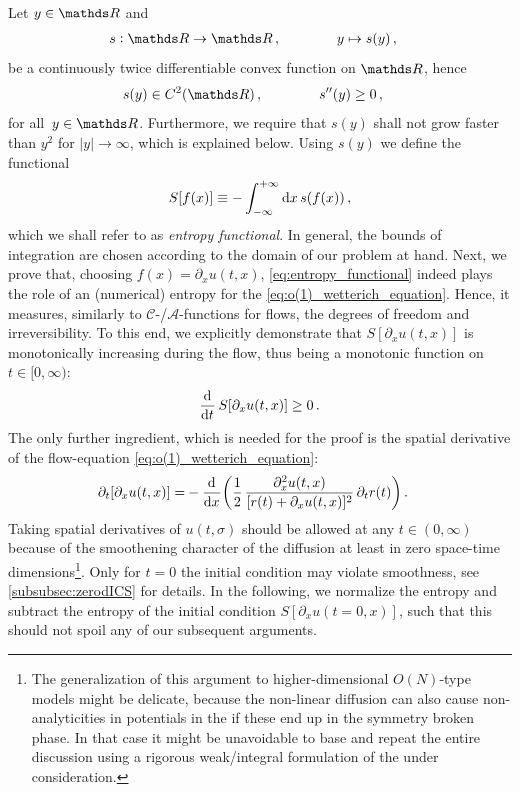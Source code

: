 Let $y \in \Reals{}$ and
\begin{align}
	&	s : \Reals{} \to \Reals{} \, ,	\qquad \qquad	y \mapsto s ( y ) \, ,
\end{align}
be a continuously twice differentiable convex function on $\Reals{}$, hence
\begin{align}
	&	s ( y ) \in C^2 ( \Reals{} ) \, ,\qquad \qquad	s^{\prime\prime} ( y ) \geq 0 \, ,	\label{eq:convexity_of_entropy_function}
\end{align}
for all~$y  \in \Reals{}$. 
Furthermore, we require that $s ( y )$ shall not grow faster than $y^2$ for $|y| \rightarrow \infty$, which is explained below. Using $s ( y )$ we define the functional
\begin{align}
	S [ f ( x ) ] \equiv - \int_{-\infty}^{+\infty} \dif x \, s ( f ( x ) ) \, ,	\label{eq:entropy_functional}
\end{align}
which we shall refer to as \textit{entropy functional}.
In general, the bounds of integration are chosen according to the domain of our problem at hand.
Next, we prove that, choosing $f ( x ) = \partial_x u ( t, x )$, \cref{eq:entropy_functional} indeed plays the role of an (numerical) entropy for the \pde{} \eqref{eq:o(1)_wetterich_equation}. 
Hence, it measures, similarly to $\mathcal{C}$-/$\mathcal{A}$-functions for \rg{} flows, the degrees of freedom and irreversibility.
To this end, we explicitly demonstrate that $S [ \partial_x u ( t, x ) ]$ is monotonically increasing during the \frg{} flow, thus being a monotonic function on $t \in [ 0, \infty )$:
\begin{align}
	\dod{}{t} S [ \partial_x u ( t, x ) ] \geq 0 \, .	\label{eq:entropy_rises}
\end{align}
The only further ingredient, which is needed for the proof is the spatial derivative of the flow-equation \eqref{eq:o(1)_wetterich_equation}:
\begin{align}
	\partial_t [ \partial_x u ( t, x ) ] = & - \dod{}{x} \! \bigg( \frac{1}{2} \, \frac{\partial_x^2 u ( t, x )}{[ r ( t ) + \partial_x u ( t , x ) ]^2}\, \partial_t r ( t )  \bigg) \, .
\end{align}
Taking spatial derivatives of $u ( t, \sigma )$ should be allowed at any $t \in ( 0 , \infty )$ because of the smoothening character of the diffusion \dash{} at least in zero space-time dimensions\footnote{\label{footnote:entropyWeakDerivation}%
	The generalization of this argument to higher-dimensional $O(N)$-type models might be delicate, because the non-linear diffusion can also cause non-analyticities in potentials in the \ir{} if these end up in the symmetry broken phase.
	In that case it might be unavoidable to base and repeat the entire discussion using a rigorous weak/integral formulation of the \pdes{} under consideration.%
}.
Only for $t = 0$ the initial condition may violate smoothness, see \cref{subsubsec:zerodICS} for details. 
In the following, we normalize the entropy and subtract the entropy of the initial condition $S [ \partial_x u ( t = 0, x ) ]$, such that this should not spoil any of our subsequent arguments.

